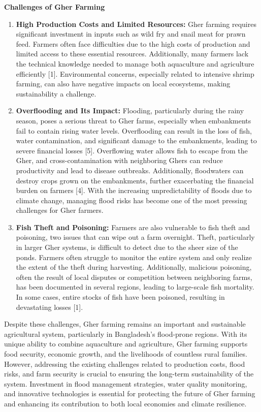 \documentclass[conference]{IEEEtran}
\begin{document}
\textbf{Challenges of Gher Farming}
\begin{enumerate}
    \item \textbf{High Production Costs and Limited Resources:} 
    Gher farming requires significant investment in inputs such as wild fry and snail meat for prawn feed. Farmers often face difficulties due to the high costs of production and limited access to these essential resources. Additionally, many farmers lack the technical knowledge needed to manage both aquaculture and agriculture efficiently [1]. Environmental concerns, especially related to intensive shrimp farming, can also have negative impacts on local ecosystems, making sustainability a challenge.

    \item \textbf{Overflooding and Its Impact:} 
Flooding, particularly during the rainy season, poses a serious threat to Gher farms, especially when embankments fail to contain rising water levels. Overflooding can result in the loss of fish, water contamination, and significant damage to the embankments, leading to severe financial losses [5]. Overflowing water allows fish to escape from the Gher, and cross-contamination with neighboring Ghers can reduce productivity and lead to disease outbreaks. Additionally, floodwaters can destroy crops grown on the embankments, further exacerbating the financial burden on farmers [4]. With the increasing unpredictability of floods due to climate change, managing flood risks has become one of the most pressing challenges for Gher farmers.

    \item \textbf{Fish Theft and Poisoning:} 
Farmers are also vulnerable to fish theft and poisoning, two issues that can wipe out a farm overnight. Theft, particularly in larger Gher systems, is difficult to detect due to the sheer size of the ponds. Farmers often struggle to monitor the entire system and only realize the extent of the theft during harvesting. Additionally, malicious poisoning, often the result of local disputes or competition between neighboring farms, has been documented in several regions, leading to large-scale fish mortality. In some cases, entire stocks of fish have been poisoned, resulting in devastating losses [1].    
        
\end{enumerate}

Despite these challenges, Gher farming remains an important and sustainable agricultural system, particularly in Bangladesh's flood-prone regions. With its unique ability to combine aquaculture and agriculture, Gher farming supports food security, economic growth, and the livelihoods of countless rural families. However, addressing the existing challenges related to production costs, flood risks, and farm security is crucial to ensuring the long-term sustainability of the system. Investment in flood management strategies, water quality monitoring, and innovative technologies is essential for protecting the future of Gher farming and enhancing its contribution to both local economies and climate resilience.
\end{document}
